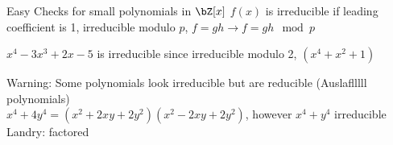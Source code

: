 \noindent
Easy Checks for small polynomials in $\bZ[x]$ 
$f(x)$ is irreducible if leading coefficient is 1, irreducible modulo $p$, $f = gh \to f=gh \mod p$ 

\begin{example}
    $x^4-3x^3 + 2x-5$ is irreducible since irreducible modulo 2, $(x^4 + x^2+1)$ 
\end{example}

\noindent
Warning: Some polynomials look irreducible but are reducible (Auslaflllll polynomials) \\
$x^4 + 4y^4 = (x^2+2xy+2y^2)(x^2 - 2xy + 2y^2)$, however $x^4+y^4$ irreducible \\
Landry: factored 
